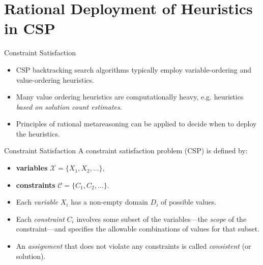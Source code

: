 \documentclass{beamer}
\begin{document}
\section{Rational Deployment of Heuristics in CSP}

\begin{frame}{Constraint Satisfaction}
\begin{itemize}
\item CSP backtracking search algorithms typically employ
  variable-ordering and value-ordering heuristics.
\item Many value ordering heuristics are computationally
  heavy, e.g. heuristics {\it based on solution count
          estimates.}
\item Principles of rational metareasoning can be applied
          to decide when to deploy the heuristics.
\end{itemize}
\end{frame}

\begin{frame}{Constraint Satisfaction}
A constraint satisfaction problem (CSP) is defined by:
\begin{itemize}
\item[] {\bf variables} $\mathcal{X}=\{X_1, X_2, ...\}$, 
\item[] {\bf constraints} $\mathcal{C}=\{C_1, C_2, ...\}$. 
\end{itemize}
\begin{itemize}
 \item Each {\it variable} $X_i$ has a non-empty domain
          $D_i$ of possible values. 
\item Each {\it constraint} $C_i$ involves some subset
          of the variables---the {\it scope} of the constraint---and specifies the
          allowable combinations of values for that subset. 
\item An {\it assignment} that does not violate any constraints is called
          {\it consistent} (or solution).
 \end{itemize}
 \end{frame}
\end{document}
